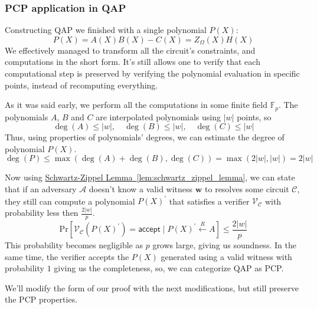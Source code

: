 \documentclass[../lecture-notes.tex]{subfiles}
\begin{document}
\subsubsection{PCP application in QAP}

Constructing QAP we finished with a single polynomial $P(X)$:
\begin{equation*}
    P(X) = A(X)B(X) - C(X) = Z_{\Omega}(X)H(X)
\end{equation*}
We effectively managed to transform all the circuit's constraints, and computations in the short form.
It's still allows one to verify that each computational step is preserved by verifying the 
polynomial evaluation in specific points, instead of recomputing everything.

As it was said early, we perform all the computations in some finite field $\mathbb{F}_p$. The 
polynomials $A$, $B$ and $C$ are interpolated polynomials using $\left| w \right|$ points, so 
\begin{equation*}
    \deg(A) \le \left| w \right|, \quad 
    \deg(B) \le \left| w \right|, \quad 
    \deg(C) \le \left| w \right|
\end{equation*}
Thus, using properties of polynomials' degrees, we can estimate the degree of polynomial $P(X)$.
\begin{equation*}
    \deg(P) \leq \max(\deg(A) + \deg(B), \deg(C)) = \max(2 \left| w \right|, \left| w \right|) = 2 \left| w \right|
\end{equation*}

Now using \hyperref[lem:schwartz_zippel_lemma]{Schwartz-Zippel Lemma~\ref{lem:schwartz_zippel_lemma}},
we can state that if an adversary $\mathcal{A}$ doesn't know a valid witness $\mathbf{w}$ to 
resolves some circuit $\mathcal{C}$, they still can compute a polynomial $P(X)^{\prime}$ that 
satisfies a verifier $\mathcal{V}_{\mathcal{C}}$ with probability less then 
$\frac{2 \left| w \right|}{p}$.
\begin{equation*}
    \text{Pr}[ \mathcal{V}_{\mathcal{C}}(P(X)^{\prime}) = \mathsf{accept} \mid P(X)^{\prime} \xleftarrow{R} A] \leq \frac{2 \left| w \right|}{p}
\end{equation*}
This probability becomes negligible as $p$ grows large, giving us soundness. In the same time, the
verifier accepts the $P(X)$ generated using a valid witness with probability $1$ giving us the 
completeness, so, we can categorize QAP as PCP. 

We'll modify the form of our proof with the next modifications, but still preserve the PCP 
properties.
\end{document}
